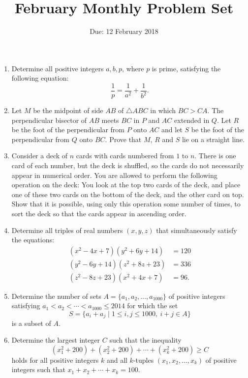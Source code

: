 \documentclass[12pt]{article}
\title{\vspace{-24pt}February Monthly Problem Set}
\author{Due: 12 February 2018}
\date{}
\begin{document}
 \maketitle \pagestyle{empty}

\begin{enumerate}

\item %
Determine all positive integers $a,b,p$, where $p$ is prime, satisfying the following equation:
  \[ \frac{1}{p} = \frac{1}{a^2} + \frac{1}{b^2}. \]


\item %
Let $M$ be the midpoint of side $AB$ of $\triangle ABC$ in which $BC>CA$. The perpendicular bisector of $AB$ meets $BC$ in $P$ and $AC$ extended in $Q$. Let $R$ be the foot of the perpendicular from $P$ onto $AC$ and let $S$ be the foot of the perpendicular from $Q$ onto $BC$. Prove that $M$, $R$ and $S$ lie on a straight line.


\item %
Consider a deck of $n$ cards with cards numbered from $1$ to $n$. There is one card of each number, but the deck is shuffled, so the cards do not necessarily appear in numerical order. You are allowed to perform the following operation on the deck: You look at the top two cards of the deck, and place one of these two cards on the bottom of the deck, and the other card on top. Show that it is possible, using only this operation some number of times, to sort the deck so that the cards appear in ascending order. 


\item %
Determine all triples of real numbers $(x,y,z)$ that simultaneously satisfy the equations:
\begin{align*}
	(x^2 - 4x + 7 )(y^2 + 6y + 14) &= 120 \\
	(y^2 - 6y + 14)(z^2 + 8z + 23) &= 336 \\
	(z^2 - 8z + 23)(x^2 + 4x + 7 ) &= 96.
\end{align*}


\item %
Determine the number of sets $A = \{a_1,a_2,\ldots, a_{1000}\}$ of positive integers satisfying $a_1 < a_2 < \dotsb < a_{1000} \le 2014$ for which the set
	\[ S = \{a_i+a_j \mid 1\le i,j\le 1000,\ i+j\in A\} \]
is a subset of $A$.


\item %
Determine the largest integer $C$ such that the inequality \[ (x_1^2+200) +(x_2^2+200) +\dotsb +(x_k^2+200) \geq C \] holds for all positive integers $k$ and all $k$-tuples $(x_1,x_2,\dotsc,x_k)$ of positive integers such that $x_1+x_2+\dotsb+x_k = 100$.



\end{enumerate}
\end{document}
